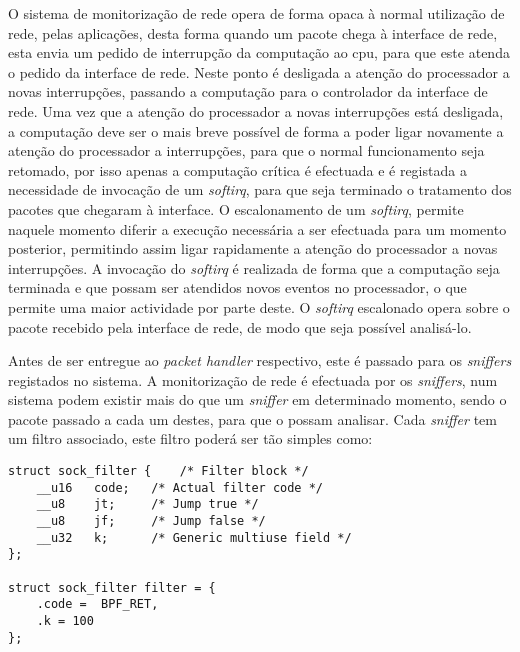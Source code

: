 

O sistema de monitorização de rede opera de forma opaca à normal utilização de rede, pelas aplicações, desta forma quando um pacote chega à interface de rede, esta envia um pedido de interrupção da computação ao cpu, para que este atenda o pedido da interface de rede.
Neste ponto é desligada a atenção do processador a novas interrupções, passando a computação para o controlador da interface de rede.
Uma vez que a atenção do processador a novas interrupções está desligada, a computação deve ser o mais breve possível de forma a poder ligar novamente a atenção do processador a interrupções, para que o normal funcionamento seja retomado, por isso apenas a computação crítica é efectuada e é registada a necessidade de invocação de um \textit{softirq}, para que seja terminado o tratamento dos pacotes que chegaram à interface.
O escalonamento de um \textit{softirq}, permite naquele momento diferir a execução necessária a ser efectuada para um momento posterior, permitindo assim ligar rapidamente a atenção do processador a novas interrupções.
A invocação do \textit{softirq} é realizada de forma que a computação seja terminada e que possam ser atendidos novos eventos no processador, o que permite uma maior actividade por parte deste.
O \textit{softirq} escalonado opera sobre o pacote recebido pela interface de rede, de modo que seja possível analisá-lo.

Antes de ser entregue ao \textit{packet handler} respectivo, este é passado para os \textit{sniffers} registados no sistema.
A monitorização de rede é efectuada por os \textit{sniffers}, num sistema podem existir mais do que um \textit{sniffer} em determinado momento, sendo o pacote passado a cada um destes, para que o possam analisar.
Cada \textit{sniffer} tem um filtro associado, este filtro poderá ser tão simples como:

\begin{lstlisting}
struct sock_filter {    /* Filter block */
	__u16	code;   /* Actual filter code */
	__u8 	jt;     /* Jump true */
	__u8 	jf;     /* Jump false */
	__u32	k;      /* Generic multiuse field */
};

struct sock_filter filter = {
	.code =  BPF_RET,
	.k = 100
};
\end{lstlisting}

